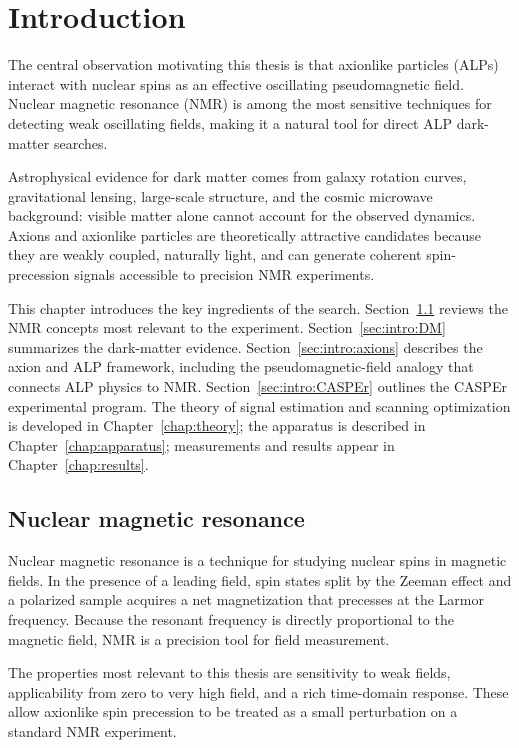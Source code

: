 \chapter{Introduction}

The central observation motivating this thesis is that axionlike particles (ALPs) interact with nuclear spins as an effective oscillating pseudomagnetic field. Nuclear magnetic resonance (NMR) is among the most sensitive techniques for detecting weak oscillating fields, making it a natural tool for direct ALP dark-matter searches.

Astrophysical evidence for dark matter comes from galaxy rotation curves, gravitational lensing, large-scale structure, and the cosmic microwave background: visible matter alone cannot account for the observed dynamics. Axions and axionlike particles are theoretically attractive candidates because they are weakly coupled, naturally light, and can generate coherent spin-precession signals accessible to precision NMR experiments.

This chapter introduces the key ingredients of the search. Section~\ref{sec:NMR} reviews the NMR concepts most relevant to the experiment. Section~\ref{sec:intro:DM} summarizes the dark-matter evidence. Section~\ref{sec:intro:axions} describes the axion and ALP framework, including the pseudomagnetic-field analogy that connects ALP physics to NMR. Section~\ref{sec:intro:CASPEr} outlines the CASPEr experimental program. The theory of signal estimation and scanning optimization is developed in Chapter~\ref{chap:theory}; the apparatus is described in Chapter~\ref{chap:apparatus}; measurements and results appear in Chapter~\ref{chap:results}.

\section{Nuclear magnetic resonance}\label{sec:NMR}
Nuclear magnetic resonance is a technique for studying nuclear spins in magnetic fields. In the presence of a leading field, spin states split by the Zeeman effect and a polarized sample acquires a net magnetization that precesses at the Larmor frequency. Because the resonant frequency is directly proportional to the magnetic field, NMR is a precision tool for field measurement.

The properties most relevant to this thesis are sensitivity to weak fields, applicability from zero to very high field, and a rich time-domain response. These allow axionlike spin precession to be treated as a small perturbation on a standard NMR experiment.

